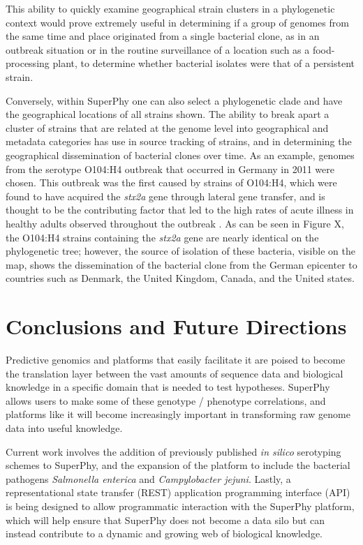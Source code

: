 \documentclass[doublespacing, linenumbers]{bmcart}
\begin{document}
This ability to quickly examine geographical strain clusters in a phylogenetic context would prove extremely useful in determining if a group of genomes from the same time and place originated from a single bacterial clone, as in an outbreak situation or in the routine surveillance of a location such as a food-processing plant, to determine whether bacterial isolates were that of a persistent strain. 

Conversely, within SuperPhy one can also select a phylogenetic clade and have the geographical locations of all strains shown. The ability to break apart a cluster of strains that are related at the genome level into geographical and metadata categories has use in source tracking of strains, and in determining the geographical dissemination of bacterial clones over time. As an example, genomes from the serotype O104:H4 outbreak that occurred in Germany in 2011 were chosen. This outbreak was the first caused by strains of O104:H4, which were found to have acquired the \textit{stx2a} gene through lateral gene transfer, and is thought to be the contributing factor that led to the high rates of acute illness in healthy adults observed throughout the outbreak \cite{mellmann_prospective_2011}. As can be seen in Figure X, the O104:H4 strains containing the \textit{stx2a} gene are nearly identical on the phylogenetic tree; however, the source of isolation of these bacteria, visible on the map, shows the dissemination of the bacterial clone from the German epicenter to countries such as Denmark, the United Kingdom, Canada, and the United states.




\section{Conclusions and Future Directions}
Predictive genomics and platforms that easily facilitate it are poised to become the translation layer between the vast amounts of sequence data and biological knowledge in a specific domain that is needed to test hypotheses. SuperPhy allows users to make some of these genotype / phenotype correlations, and platforms like it will become increasingly important in transforming raw genome data into useful knowledge. 

Current work involves the addition of previously published \textit{in silico} serotyping schemes to SuperPhy, and the expansion of the platform to include the bacterial pathogens \textit{Salmonella enterica} and \textit{Campylobacter jejuni}. Lastly, a representational state transfer (REST) application programming interface (API) is being designed to allow programmatic interaction with the SuperPhy platform, which will help ensure that SuperPhy does not become a data silo but can instead contribute to a dynamic and growing web of biological knowledge.
 
\end{document}
